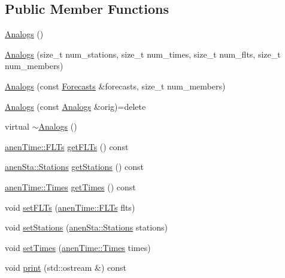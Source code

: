 \subsection*{Public Member Functions}
\begin{DoxyCompactItemize}
\item 
\mbox{\hyperlink{class_analogs_a8234aca0bc007305113d41b3e9f44a30}{Analogs}} ()
\item 
\mbox{\hyperlink{class_analogs_ab8fda7c92e8685f0be660ecdf7bf32a3}{Analogs}} (size\+\_\+t num\+\_\+stations, size\+\_\+t num\+\_\+times, size\+\_\+t num\+\_\+flts, size\+\_\+t num\+\_\+members)
\item 
\mbox{\hyperlink{class_analogs_a8e13e48e4097462f1ff324fa62c6481c}{Analogs}} (const \mbox{\hyperlink{class_forecasts}{Forecasts}} \&forecasts, size\+\_\+t num\+\_\+members)
\item 
\mbox{\hyperlink{class_analogs_af4174aafbd1d9d21cc4ea9ee3ab62dfd}{Analogs}} (const \mbox{\hyperlink{class_analogs}{Analogs}} \&orig)=delete
\item 
virtual \mbox{\hyperlink{class_analogs_ae6de501f002f0a3c878d44d5c7b67a0d}{$\sim$\+Analogs}} ()
\item 
\mbox{\hyperlink{classanen_time_1_1_f_l_ts}{anen\+Time\+::\+F\+L\+Ts}} \mbox{\hyperlink{class_analogs_a7803faee9bf541f68f7e9a5df762f684}{get\+F\+L\+Ts}} () const
\item 
\mbox{\hyperlink{classanen_sta_1_1_stations}{anen\+Sta\+::\+Stations}} \mbox{\hyperlink{class_analogs_aa618fe7556a1bc7ec39ddea07dc41a70}{get\+Stations}} () const
\item 
\mbox{\hyperlink{classanen_time_1_1_times}{anen\+Time\+::\+Times}} \mbox{\hyperlink{class_analogs_af30fe2ceec49634f69a9ce0d6f7665ea}{get\+Times}} () const
\item 
void \mbox{\hyperlink{class_analogs_adcbabe9274d828c96d1cff1b807b3a6d}{set\+F\+L\+Ts}} (\mbox{\hyperlink{classanen_time_1_1_f_l_ts}{anen\+Time\+::\+F\+L\+Ts}} flts)
\item 
void \mbox{\hyperlink{class_analogs_a143c555b8cf7bd6fa457850b3dfa3f91}{set\+Stations}} (\mbox{\hyperlink{classanen_sta_1_1_stations}{anen\+Sta\+::\+Stations}} stations)
\item 
void \mbox{\hyperlink{class_analogs_a347217a824838542cc3440bc5362e535}{set\+Times}} (\mbox{\hyperlink{classanen_time_1_1_times}{anen\+Time\+::\+Times}} times)
\item 
void \mbox{\hyperlink{class_analogs_a8ed3949305fc98471e987ae03c305c17}{print}} (std\+::ostream \&) const
\end{DoxyCompactItemize}
